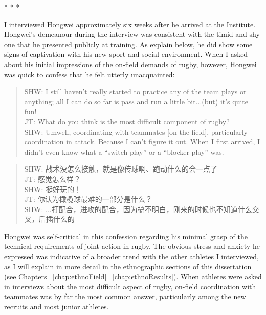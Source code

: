 \begin{CJK}{UTF8}{gbsn}
                        \begin{center}
                          * * *
                        \end{center}

I interviewed Hongwei approximately six weeks after he arrived at the Institute.  Hongwei's demeanour during the interview was consistent with the timid and shy one that he presented publicly at training.  As explain below, he did show some signs of captivation with his new sport and social environment.  When I asked about his initial impressions of the on-field demands of rugby, however, Hongwei was quick to confess that he felt utterly unacquainted:

  \begin{quotation}
    SHW: I still haven’t really started to practice any of the team plays or anything; all I can do so far is pass and run a little bit...(but) it's quite fun! \\
    JT: What do you think is the most difficult component of rugby? \\
    SHW: Um\textellipsis well, coordinating with teammates [on the field], particularly coordination in attack.  Because I can't figure it out.  When I first arrived, I didn’t even know what a ``switch play'' or a ``blocker play'' was.
  \end{quotation}

  \begin{quotation}
    SHW: 战术没怎么接触，就是像传球啊、跑动什么的会一点了 \\
    JT: 感觉怎么样？\\
    SHW: 挺好玩的！\\
    JT: 你认为橄榄球最难的一部分是什么？ \\
    SHW: ...打配合，进攻的配合，因为搞不明白，刚来的时候也不知道什么交叉，后插什么的 \\
  \end{quotation}

Hongwei was self-critical in this confession regarding his minimal grasp of the technical requirements of joint action in rugby.  The obvious stress and anxiety he expressed was indicative of a broader trend with the other athletes I interviewed, as I will explain in more detail in the ethnographic sections of this dissertation (see Chapters ~\ref{chap:ethnoField} \nobreakdash~\ref{chap:ethnoResults}). When athletes were asked in interviews about the most difficult aspect of rugby, on-field coordination with teammates was by far the most common answer, particularly among the new recruits and most junior athletes.


\end{CJK}
